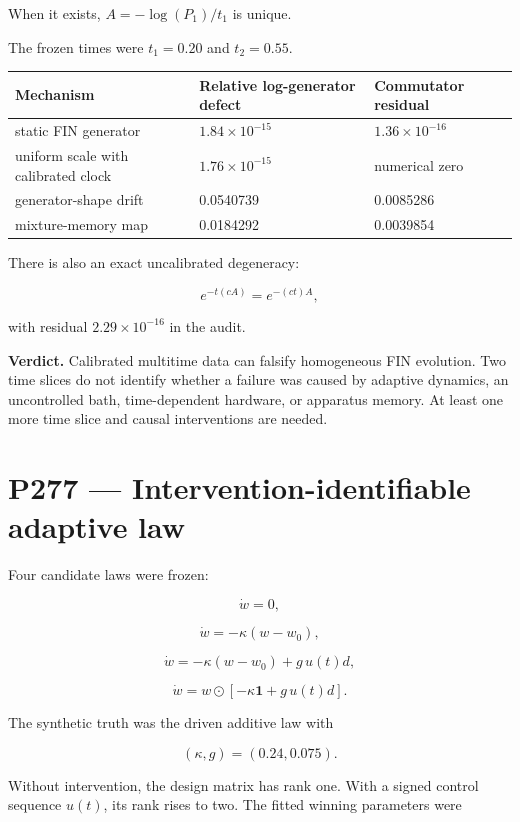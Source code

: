 \documentclass[11pt,a4paper,openany]{report}
\begin{document}
When it exists, \(A=-\log(P_1)/t_1\) is unique.

The frozen times were \(t_1=0.20\) and \(t_2=0.55\).

\begin{center}
\begingroup\small
\setlength{\tabcolsep}{2.5pt}
\renewcommand{\arraystretch}{1.16}
\begin{longtable}{@{}p{}p{}p{}@{}}
\toprule
\textbf{Mechanism} & \textbf{Relative log-generator defect} & \textbf{Commutator residual} \\
\midrule
\endhead
static FIN generator & \(1.84\times10^{-15}\) & \(1.36\times10^{-16}\) \\
uniform scale with calibrated clock & \(1.76\times10^{-15}\) & numerical zero \\
generator-shape drift & 0.0540739 & 0.0085286 \\
mixture-memory map & 0.0184292 & 0.0039854 \\
\bottomrule
\end{longtable}
\endgroup
\end{center}

There is also an exact uncalibrated degeneracy:

\[
e^{-t(cA)}=e^{-(ct)A},
\]

with residual \(2.29\times10^{-16}\) in the audit.

\textbf{Verdict.} Calibrated multitime data can falsify homogeneous FIN evolution. Two time slices do not identify whether a failure was caused by adaptive dynamics, an uncontrolled bath, time-dependent hardware, or apparatus memory. At least one more time slice and causal interventions are needed.

\chapter{P277 --- Intervention-identifiable adaptive law}

Four candidate laws were frozen:

\[
\dot w=0,
\]

\[
\dot w=-\kappa(w-w_0),
\]

\[
\dot w=-\kappa(w-w_0)+g\,u(t)d,
\]

\[
\dot w=w\odot[-\kappa\mathbf1+g\,u(t)d].
\]

The synthetic truth was the driven additive law with

\[
(\kappa,g)=(0.24,0.075).
\]

Without intervention, the design matrix has rank one. With a signed control sequence \(u(t)\), its rank rises to two. The fitted winning parameters were
\end{document}
